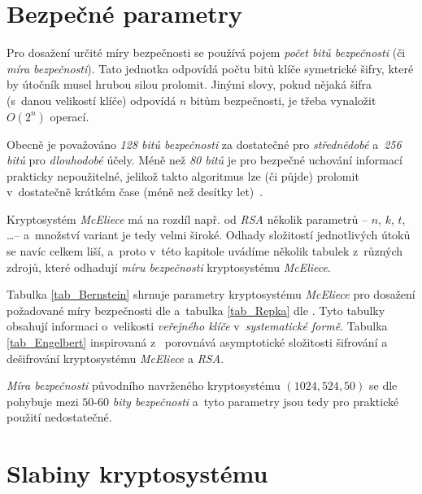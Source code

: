 \documentclass[thesis=M,czech,hidelinks]{FITthesis}[2012/06/26]
\newcommand{\0}{{\textcolor[gray]{0.75}{0}}}
\begin{document}
\section{Bezpečné parametry}\label{kap_bezpecne_parametry}

Pro dosažení určité míry bezpečnosti se používá pojem \emph{počet bitů
bezpečnosti} (či \emph{míra bezpečnosti}). Tato jednotka odpovídá počtu bitů
klíče symetrické šifry, které by útočník musel hrubou silou prolomit. Jinými
slovy, pokud nějaká šifra (s~danou velikostí klíče) odpovídá $n$ bitům
bezpečnosti, je třeba vynaložit $O\left(2^n\right)$ operací.

Obecně je považováno \emph{128 bitů bezpečnosti} za dostatečné pro
\emph{střednědobé} a~\emph{256 bitů} pro \emph{dlouhodobé} účely. Méně než
\emph{80 bitů} je pro bezpečné uchování informací prakticky nepoužitelné,
jelikož takto  algoritmus lze (či půjde) prolomit v~dostatečně krátkém
čase (méně než desítky let)~\cite{Paar}.

Kryptosystém \emph{McEliece} má na rozdíl např. od \emph{RSA} několik parametrů
-- $n$, $k$, $t$, \ldots -- a~množství variant je tedy velmi široké. Odhady
složitostí jednotlivých útoků se navíc celkem liší, a~proto v~této kapitole
uvádíme několik tabulek z~různých zdrojů, které odhadují \emph{míru bezpečnosti}
kryptosystému \emph{McEliece}.

Tabulka \ref{tab_Bernstein} shrnuje parametry kryptosystému \emph{McEliece}
pro dosažení požadované míry bezpečnosti dle \cite{Bernstein1} a~tabulka
\ref{tab_Repka} dle \cite{Repka}. Tyto tabulky obsahují informaci o~velikosti
\emph{veřejného klíče} v~\emph{systematické formě}. Tabulka \ref{tab_Engelbert}
inspirovaná z~\cite{Engelbert,Paar} porovnává asymptotické složitosti šifrování
a dešifrování kryptosystému \emph{McEliece} a \emph{RSA}.

\emph{Míra bezpečnosti} původního navrženého kryptosystému
$\left(1024,524,50\right)$ se dle~\cite{Canteaut,Repka} pohybuje mezi $50$-$60$
\emph{bity bezpečnosti} a~tyto parametry jsou tedy pro praktické použití
nedostatečné.



\section{Slabiny kryptosystému}\label{kap_slabiny}
\end{document}

